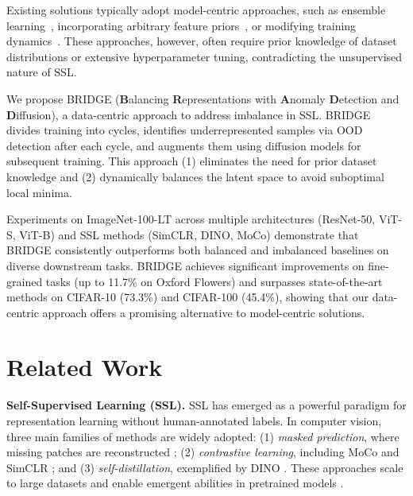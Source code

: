 \documentclass{article} %
\begin{document}
Existing solutions typically adopt model-centric approaches, such as ensemble learning~\citep{tian2021divide}, incorporating arbitrary feature priors~\citep{assran2210hidden}, or modifying training dynamics~\citep{ts}. These approaches, however, often require prior knowledge of dataset distributions or extensive hyperparameter tuning, contradicting the unsupervised nature of SSL.

We propose BRIDGE (\textbf{B}alancing \textbf{R}epresentations with \textbf{A}nomaly \textbf{D}etection and \textbf{D}iffusion), a data-centric approach to address imbalance in SSL. BRIDGE divides training into cycles, identifies underrepresented samples via OOD detection after each cycle, and augments them using diffusion models for subsequent training. This approach (1) eliminates the need for prior dataset knowledge and (2) dynamically balances the latent space to avoid suboptimal local minima.

Experiments on ImageNet-100-LT across multiple architectures (ResNet-50, ViT-S, ViT-B) and SSL methods (SimCLR, DINO, MoCo) demonstrate that BRIDGE consistently outperforms both balanced and imbalanced baselines on diverse downstream tasks. BRIDGE achieves significant improvements on fine-grained tasks (up to 11.7\% on Oxford Flowers) and surpasses state-of-the-art methods on CIFAR-10 (73.3\%) and CIFAR-100 (45.4\%), showing that our data-centric approach offers a promising alternative to model-centric solutions.

\section{Related Work}
\label{sec:related-work}

\noindent
\textbf{Self-Supervised Learning (SSL).} 
SSL has emerged as a powerful paradigm for representation learning without human-annotated labels. In computer vision, three main families of methods are widely adopted: (1) \emph{masked prediction}, where missing patches are reconstructed \citep{he2022masked}; (2) \emph{contrastive learning}, including MoCo \citep{he2020momentum} and SimCLR \citep{chen2020simple}; and (3) \emph{self-distillation}, exemplified by DINO \citep{DINO}. These approaches scale to large datasets and enable emergent abilities in pretrained models \citep{wei2022emergent}.
\end{document}
